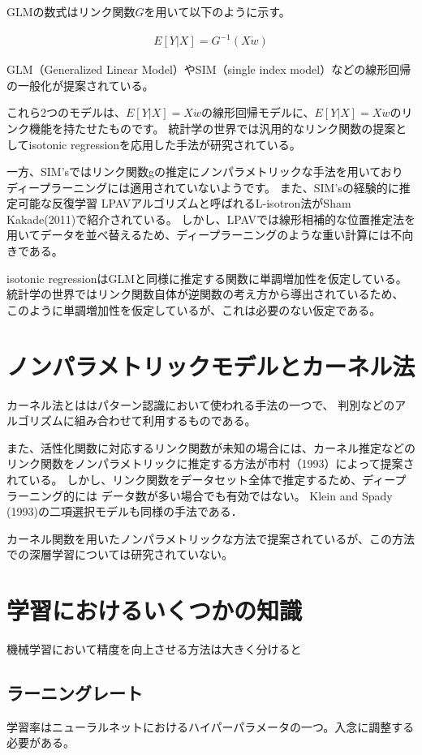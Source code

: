 GLMの数式はリンク関数$ G $を用いて以下のように示す。

\begin{eqnarray}
E[Y|X]=G^{-1} (X\dot w)
\end{eqnarray}

GLM（Generalized Linear Model）やSIM（single index model）などの線形回帰の一般化が提案されている。

これら2つのモデルは、$ E[Y|X]=X\dot w $の線形回帰モデルに、$ E[Y|X]=X\dot w $のリンク機能を持たせたものです。 
統計学の世界では汎用的なリンク関数の提案としてisotonic regressionを応用した手法が研究されている。


 一方、SIM'sではリンク関数gの推定にノンパラメトリックな手法を用いており ディープラーニングには適用されていないようです。
 また、SIM'sの経験的に推定可能な反復学習 LPAVアルゴリズムと呼ばれるL-isotron法がSham Kakade(2011)で紹介されている。 
 しかし、LPAVでは線形相補的な位置推定法を用いてデータを並べ替えるため、ディープラーニングのような重い計算には不向きである。 

isotonic regressionはGLMと同様に推定する関数に単調増加性を仮定している。統計学の世界ではリンク関数自体が逆関数の考え方から導出されているため、
このように単調増加性を仮定しているが、これは必要のない仮定である。

\section{ノンパラメトリックモデルとカーネル法}

カーネル法とははパターン認識において使われる手法の一つで、 判別などのアルゴリズムに組み合わせて利用するものである。

 また、活性化関数に対応するリンク関数が未知の場合には、カーネル推定などのリンク関数をノンパラメトリックに推定する方法が市村（1993）によって提案されている。
 しかし、リンク関数をデータセット全体で推定するため、ディープラーニング的には データ数が多い場合でも有効ではない。
 Klein and Spady (1993)の二項選択モデルも同様の手法である．

 カーネル関数を用いたノンパラメトリックな方法で提案されているが、この方法での深層学習については研究されていない。




\section{学習におけるいくつかの知識}
機械学習において精度を向上させる方法は大きく分けると
\subsection{ラーニングレート}
学習率はニューラルネットにおけるハイパーパラメータの一つ。入念に調整する必要がある。
